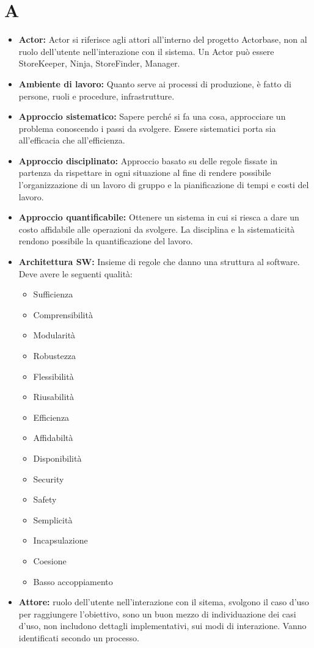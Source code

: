 \documentclass[a4paper]{article}
\begin{document}
	\section*{A}
		\begin{itemize}
			\item \textbf{Actor:} Actor si riferisce agli attori all'interno del progetto Actorbase, 
			non al ruolo dell'utente nell'interazione con il sistema. Un Actor può essere StoreKeeper, 
			Ninja, StoreFinder, Manager.
			\item \textbf{Ambiente di lavoro:} Quanto serve ai processi di produzione, è fatto di persone, 
			ruoli e procedure, infrastrutture.
			\item \textbf{Approccio sistematico:} Sapere perché si fa una cosa, approcciare un problema 
			conoscendo i passi da svolgere. Essere sistematici porta sia all’efficacia che all’efficienza.
			\item \textbf{Approccio disciplinato:} Approccio basato su delle regole fissate in partenza da 
			rispettare in ogni situazione al fine di rendere possibile l’organizzazione di un lavoro di gruppo 
			e la pianificazione di tempi e costi del lavoro.
			\item \textbf{Approccio quantificabile:} Ottenere un sistema in cui si riesca a dare un costo 
			affidabile alle operazioni da svolgere. La disciplina e la sistematicità rendono possibile la 
			quantificazione del lavoro.
			\item \textbf{Architettura SW:} Insieme di regole che danno una struttura al software. Deve avere le seguenti qualità:
			\begin{itemize}
				\item  Sufficienza
				\item  Comprensibilità
				\item  Modularità
				\item  Robustezza 
				\item  Flessibilità
				\item  Riusabilità
				\item  Efficienza
				\item  Affidabiltà
				\item  Disponibilità
				\item  Security
				\item  Safety
				\item  Semplicità
				\item  Incapsulazione
				\item  Coesione
				\item  Basso accoppiamento
			\end{itemize}
			\item \textbf{Attore:}  ruolo dell'utente nell'interazione con il sitema, svolgono il caso d'uso per raggiungere l'obiettivo, 
			sono un buon mezzo di individuazione dei casi d'uso, non includono dettagli implementativi, sui modi di interazione. Vanno 
			identificati secondo un processo.
		\end{itemize}
		
\end{document}
